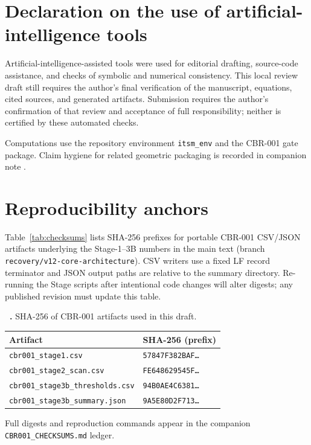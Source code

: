 \documentclass[aps,prd,reprint,superscriptaddress,nofootinbib,floatfix,showkeys]{revtex4-2}
\begin{document}
\section*{Declaration on the use of artificial-intelligence tools}

Artificial-intelligence-assisted tools were used for editorial drafting,
source-code assistance, and checks of symbolic and numerical consistency.
This local review draft still requires the author's final verification of
the manuscript, equations, cited sources, and generated artifacts. Submission
requires the author's confirmation of that review and acceptance of full
responsibility; neither is certified by these automated checks.

\begin{acknowledgments}
Computations use the repository environment \texttt{itsm\_env} and the
CBR-001 gate package.
Claim hygiene for related geometric packaging is recorded in companion note
\cite{boyd_p1}.
\end{acknowledgments}

\appendix

\section{Reproducibility anchors}
\label{app:checksums}

Table~\ref{tab:checksums} lists SHA-256 prefixes for portable CBR-001 CSV/JSON
artifacts underlying the Stage-1--3B numbers in the main text (branch
\texttt{recovery/v12-core-architecture}).  CSV writers use a fixed LF record
terminator and JSON output paths are relative to the summary directory.
Re-running the Stage scripts after intentional code changes will alter digests;
any published revision must update this table.

\begin{center}
\label{tab:checksums}
\small
\textbf{\MakeUppercase{\tablename}~\thetable.} SHA-256 of CBR-001 artifacts
used in this draft.
\par\smallskip
\begin{ruledtabular}
\begin{tabular}{ll}
Artifact & SHA-256 (prefix) \\
\hline
\texttt{cbr001\_stage1.csv} & \texttt{57847F382BAF\ldots} \\
\texttt{cbr001\_stage2\_scan.csv} & \texttt{FE648629545F\ldots} \\
\texttt{cbr001\_stage3b\_thresholds.csv} & \texttt{94B0AE4C6381\ldots} \\
\texttt{cbr001\_stage3b\_summary.json} & \texttt{9A5E80D2F713\ldots} \\
\end{tabular}
\end{ruledtabular}
\end{center}

Full digests and reproduction commands appear in the companion
\texttt{CBR001\_CHECKSUMS.md} ledger.


\end{document}
